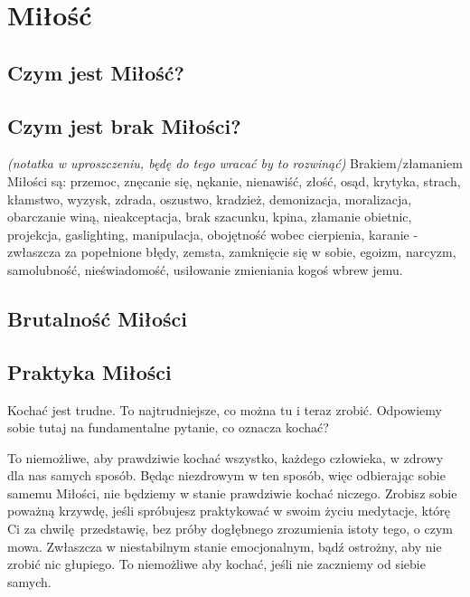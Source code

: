 \section{Miłość}
\label{milosc}

\subsection{Czym jest Miłość?}
\label{milosc/milosc}

\subsection{Czym jest brak Miłości?}
\label{milosc/brak-milosci}

\emph{(notatka w uproszczeniu, będę do tego wracać by to rozwinąć)}
Brakiem/złamaniem Miłości są:
przemoc, znęcanie się, nękanie, nienawiść, złość, osąd, krytyka,
strach, kłamstwo, wyzysk, zdrada, oszustwo, kradzież,
demonizacja, moralizacja, obarczanie winą, nieakceptacja, 
brak szacunku, kpina, złamanie obietnic, projekcja, gaslighting, manipulacja,
obojętność wobec cierpienia, karanie - zwłaszcza za popełnione błędy,
zemsta, zamknięcie się w sobie, egoizm, narcyzm, samolubność,
nieświadomość, usiłowanie zmieniania kogoś wbrew jemu.

\subsection{Brutalność Miłości}
\label{milosc/brutalnosc-milosci}

\subsection{Praktyka Miłości}
\label{milosc/praktyka-milosci}

Kochać jest trudne. To najtrudniejsze, co można tu i teraz zrobić.
Odpowiemy sobie tutaj na fundamentalne pytanie, co oznacza kochać?

To niemożliwe, aby prawdziwie kochać wszystko, każdego człowieka, w zdrowy dla nas samych sposób.
Będąc niezdrowym w ten sposób, więc odbierając sobie samemu Miłości, nie będziemy w stanie prawdziwie kochać niczego.
Zrobisz sobie poważną krzywdę, jeśli spróbujesz praktykować w swoim życiu medytacje, którę Ci za chwilę przedstawię,
bez próby dogłębnego zrozumienia istoty tego, o czym mowa.
Zwłaszcza w niestabilnym stanie emocjonalnym, bądź ostrożny, aby nie zrobić nic głupiego.
To niemożliwe aby kochać, jeśli nie zaczniemy od siebie samych. 

